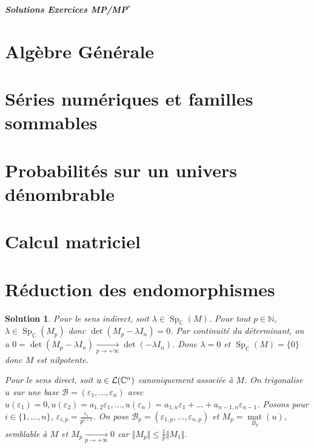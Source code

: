 \documentclass[12pt]{article}
\newtheorem{solution}{Solution}[section]
\theoremstyle{remark}
\newcommand{\C}{\mathbb{C}} \newcommand{\Q}{\mathbb{Q}}
\newcommand{\N}{\mathbb{N}} \newcommand{\Z}{\mathbb{Z}}
\DeclareMathOperator{\Sp}{Sp} \DeclareMathOperator{\mat}{mat}
\begin{document}
\begin{titlepage}
	\centering
	\vspace*{\fill}
	\Huge \textit{\textbf{Solutions Exercices MP/MP$^*$}}
	\vspace*{\fill}
\end{titlepage}

\cleardoublepage

\tableofcontents

\cleardoublepage

\section{Algèbre Générale}
\cleardoublepage
\section{Séries numériques et familles sommables}
\cleardoublepage
\section{Probabilités sur un univers dénombrable}
\cleardoublepage
\section{Calcul matriciel}
\cleardoublepage
\section{Réduction des endomorphismes}


\begin{solution}
	Pour le sens indirect, soit $\lambda\in\Sp_{\C}(M)$. Pour tout $p\in\N$, $\lambda\in\Sp_{\C}(M_{p})$ donc $\det(M_{p}-\lambda I_{n})=0$. Par continuité du déterminant, on a $0=\det(M_{p}-\lambda I_{n})\xrightarrow[p\to+\infty]{}\det(-\lambda I_{n})$. Donc $\lambda=0$ et $\Sp_{\C}(M)=\{0\}$ donc $M$ est nilpotente.

	Pour le sens direct, soit $u\in\L(\C^{n})$ canoniquement associée à $M$. On trigonalise $u$ sur une base $\mathcal{B}=(\varepsilon_{1},\dots,\varepsilon_{n})$ avec $u(\varepsilon_{1})=0,u(\varepsilon_{2})=a_{1,2}\varepsilon_{1},\dots,u(\varepsilon_{n})=a_{1,n}\varepsilon_{1}+\dots+a_{n-1,n}\varepsilon_{n-1}$. Posons pour $i\in\{1,\dots,n\}$, $\varepsilon_{i,p}=\frac{\varepsilon_{i}}{p^{i-1}}$. On pose $\mathcal{B}_{p}=(\varepsilon_{1,p},\dots,\varepsilon_{n,p})$ et $M_{p}=\mat\limits_{B_{p}}(u)$, semblable à $M$ et $M_{p}\xrightarrow[p\to+\infty]{}0$ car $\Vert M_{p}\Vert\leqslant\frac{1}{p}\Vert M_{1}\Vert$.
\end{solution}
\end{document}
